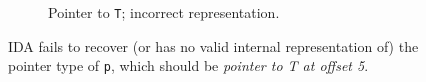 \begin{figure}[htbp]
\begin{subfigure}[ht]{0.45\textwidth}
		\caption{Pointer to \texttt{T}; incorrect representation.}
		\label{fig:ida_struct_2}
	\end{subfigure}
	\caption{IDA fails to recover (or has no valid internal representation of) the pointer type of \texttt{p}, which should be \textit{pointer to T at offset 5}.}
	\label{fig:ida_struct}
\end{figure}
